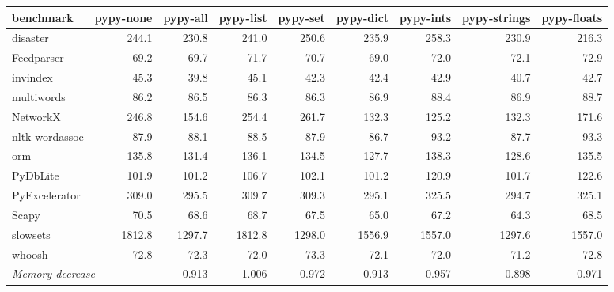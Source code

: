 \addtolength{\tabcolsep}{-2pt}
\begin{tabular}{ l  r r r r r r r r}
\toprule
benchmark & pypy-none & pypy-all & pypy-list & pypy-set & pypy-dict & pypy-ints & pypy-strings & pypy-floats\\
\midrule
disaster & 244.1 & 230.8 & 241.0 & 250.6 & 235.9 & 258.3 & 230.9 & 216.3 \\
Feedparser & 69.2 & 69.7 & 71.7 & 70.7 & 69.0 & 72.0 & 72.1 & 72.9 \\
invindex & 45.3 & 39.8 & 45.1 & 42.3 & 42.4 & 42.9 & 40.7 & 42.7 \\
multiwords & 86.2 & 86.5 & 86.3 & 86.3 & 86.9 & 88.4 & 86.9 & 88.7 \\
NetworkX & 246.8 & 154.6 & 254.4 & 261.7 & 132.3 & 125.2 & 132.3 & 171.6 \\
nltk-wordassoc & 87.9 & 88.1 & 88.5 & 87.9 & 86.7 & 93.2 & 87.7 & 93.3 \\
orm & 135.8 & 131.4 & 136.1 & 134.5 & 127.7 & 138.3 & 128.6 & 135.5 \\
PyDbLite & 101.9 & 101.2 & 106.7 & 102.1 & 101.2 & 120.9 & 101.7 & 122.6 \\
PyExcelerator & 309.0 & 295.5 & 309.7 & 309.3 & 295.1 & 325.5 & 294.7 & 325.1 \\
Scapy & 70.5 & 68.6 & 68.7 & 67.5 & 65.0 & 67.2 & 64.3 & 68.5 \\
slowsets & 1812.8 & 1297.7 & 1812.8 & 1298.0 & 1556.9 & 1557.0 & 1297.6 & 1557.0 \\
whoosh & 72.8 & 72.3 & 72.0 & 73.3 & 72.1 & 72.0 & 71.2 & 72.8 \\
\midrule
\multicolumn{2}{l}{\emph{Memory decrease}} & 0.913 & 1.006 & 0.972 & 0.913 & 0.957 & 0.898 & 0.971 \\
\bottomrule

\end{tabular}
